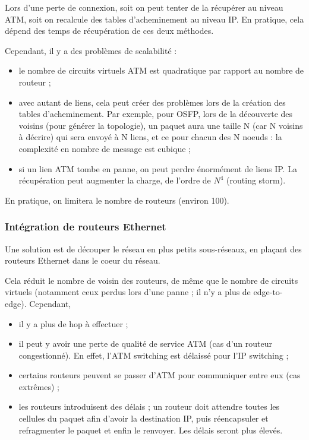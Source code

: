 	
			Lors d'une perte de connexion, soit on peut tenter de la récupérer au niveau ATM, soit on recalcule des tables d'acheminement au niveau IP. En pratique, cela dépend des temps de récupération de ces deux méthodes.
	
			Cependant, il y a des problèmes de scalabilité :
	
			\begin{itemize}
				\item le nombre de circuits virtuels ATM est quadratique par rapport au nombre de routeur ;
				\item avec autant de liens, cela peut créer des problèmes lors de la création des tables d'acheminement. Par exemple, pour OSFP, lors de la découverte des voisins (pour générer la topologie), un paquet aura une taille N (car N voisins à décrire) qui sera envoyé à N liens, et ce pour chacun des N noeuds : la complexité en nombre de message est cubique ;
				\item si un lien ATM tombe en panne, on peut perdre énormément de liens IP. La récupération peut augmenter la charge, de l'ordre de $N^4$ (routing storm).
			\end{itemize}
	
			En pratique, on limitera le nombre de routeurs (environ 100).

			\subsubsection{Intégration de routeurs Ethernet}
			
			Une solution est de découper le réseau en plus petits sous-réseaux, en plaçant des routeurs Ethernet dans le coeur du réseau.
	
	
			Cela réduit le nombre de voisin des routeurs, de même que le nombre de circuits virtuels (notamment ceux perdus lors d'une panne ; il n'y a plus de edge-to-edge). Cependant,
			\begin{itemize}
				\item il y a plus de hop à effectuer ;
				\item il peut y avoir une perte de qualité de service ATM (cas d'un routeur congestionné). En effet, l'ATM switching est délaissé pour l'IP switching ;
				\item certains routeurs peuvent se passer d'ATM pour communiquer entre eux (cas extrêmes) ;
				\item les routeurs introduisent des délais ; un routeur doit attendre toutes les cellules du paquet afin d'avoir la destination IP, puis réencapsuler et refragmenter le paquet et enfin le renvoyer. Les délais seront plus élevés.
			\end{itemize}
			
